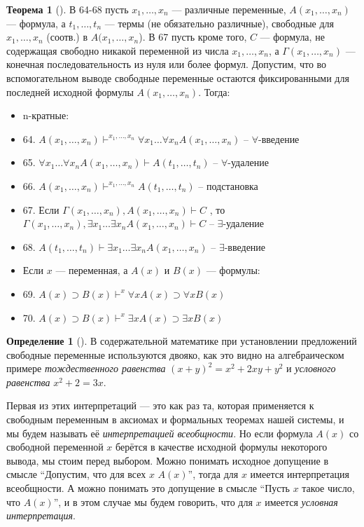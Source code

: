 \documentclass[a4paper, 12pt]{article}  %
\theoremstyle{definition}
\newtheorem{theorem}{Теорема}
\newtheorem*{definition}{Определение}
\begin{document}
	\begin{theorem}[]
		В 64-68 пусть $x_1, \dots, x_n$ --- различные переменные, $A(x_1, \dots, x_n)$ --- формула, а
		$t_1, \dots, t_n$ --- термы (не обязательно различные), свободные для $x_1, \dots, x_n$
		(соотв.) в $A(x_1, \dots, x_n$). В 67 пусть кроме того, $C$ --- формула, не содержащая
		свободно никакой переменной из числа $x_1, \dots, x_n$, а $\Gamma (x_1, \dots, x_n)$ ---
		конечная последовательность из нуля или более формул. Допустим, что во вспомогательном выводе
		свободные переменные остаются фиксированными для последней исходной формулы 
		$A(x_1, \dots, x_n)$. Тогда:
		\begin{itemize}[label={}]
			\setlength\itemsep{0pt}
			
			\item n-кратные:
			\item 64. $A(x_1, \dots, x_n) \vdash^{x_1, \dots, x_n} \forall x_1 \dots \forall x_n A(x_1, \dots, x_n)$ -- $\forall$-введение 
			\item 65. $\forall x_1 \dots \forall x_n A(x_1, \dots, x_n) \vdash A(t_1, \dots, t_n)$ -- $\forall$-удаление
			\item 66. $A(x_1, \dots, x_n) \vdash^{x_1, \dots, x_n} A(t_1, \dots, t_n)$ -- подстановка 
			\item 67. Если $\Gamma(x_1, \dots, x_n), A(x_1, \dots, x_n) \vdash C$ , то $\Gamma(x_1, \dots, x_n), \exists x_1 \dots \exists x_n A(x_1, \dots, x_n) \vdash C$ --  $\exists$-удаление
			\item 68. $A(t_1, \dots, t_n) \vdash \exists x_1 \dots \exists x_n A(x_1, \dots, x_n)$ -- $\exists$-введение
			\item Если $x$ --- переменная, а $A(x)$ и $B(x)$ --- формулы:
			\item 69. $A(x) \supset B(x) \vdash^x \forall x A(x) \supset \forall x B(x)$
			\item 70. $A(x) \supset B(x) \vdash^x \exists x A(x) \supset \exists x B(x)$
		\end{itemize}
	\end{theorem}

	\begin{definition}[]
		В содержательной математике при установлении предложений свободные переменные используются
		двояко, как это видно на алгебраическом примере \textit{тождественного равенства}
		$(x + y)^2 = x^2 + 2xy + y^2$ и \textit{условного равенства} $x^2 + 2 = 3x$.
		
		Первая из этих интерпретаций --- это как раз та, которая применяется к свободным переменным в
		аксиомах и формальных теоремах нашей системы, и мы будем называть её 
		\textit{интерпретацией всеобщности}. Но если формула $A(x)$ со свободной переменной $x$
		берётся в качестве исходной формулы некоторого вывода, мы стоим перед выбором. Можно понимать
		исходное допущение в смысле ``Допустим, что для всех $x$ $A(x)$'', тогда для $x$ имеется
		интерпретация всеобщности. А можно понимать это допущение в смысле ``Пусть $x$ такое число,
		что $A(x)$'', и в этом случае мы будем говорить, что для $x$ имеется
		\textit{условная интерпретация}.		
	\end{definition}
\end{document}
